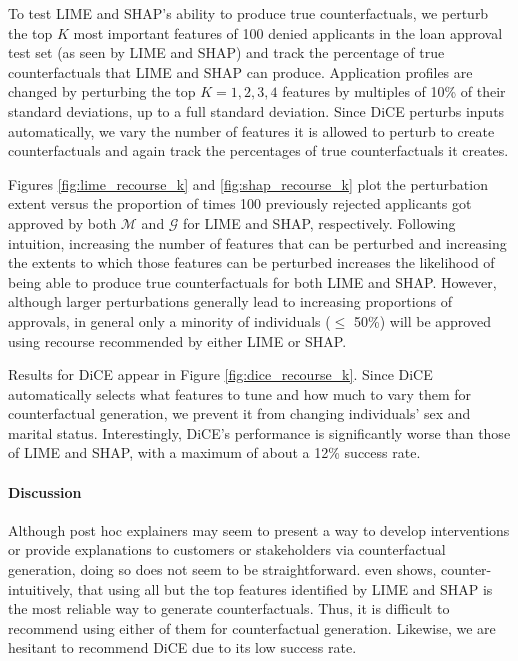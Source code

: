 \documentclass[11pt]{article}    %
\newcommand{\tw}[1]{\textcolor{red}{Tong: #1}}
\begin{document}
            
        To test LIME and SHAP's ability to produce true counterfactuals, we perturb the top $K$ most important features of 100 denied applicants in the loan approval test set (as seen by LIME and SHAP) and track the percentage of true counterfactuals that LIME and SHAP can produce.  Application profiles are changed by perturbing the top $K=1,2,3,4$ features by multiples of 10\% of their standard deviations, up to a full standard deviation. Since DiCE perturbs inputs automatically, we vary the number of features it is allowed to perturb to create counterfactuals and again track the percentages of true counterfactuals it creates.
            
            





        
            Figures \ref{fig:lime_recourse_k} and \ref{fig:shap_recourse_k} plot the perturbation extent versus the proportion of times 100 previously rejected applicants got approved by both $\mathcal{M}$ and $\mathcal{G}$ for LIME and SHAP, respectively. Following intuition, increasing the number of features that can be perturbed and increasing the extents to which those features can be perturbed increases the likelihood of being able to produce true counterfactuals for both LIME and SHAP. However, although larger perturbations generally lead to increasing proportions of approvals, in general only a minority of individuals ($\leq$ 50\%) will be approved using recourse recommended by either LIME or SHAP. 
            
            Results for DiCE appear in Figure \ref{fig:dice_recourse_k}. Since DiCE automatically selects what features to tune and how much to vary them for counterfactual generation, we prevent it from changing individuals' sex and marital status. Interestingly, DiCE's performance is significantly worse than those of LIME and SHAP, with a maximum of about a 12\% success rate. 

            \paragraph{Discussion}
            Although post hoc explainers may seem to present a way to develop interventions or provide explanations to customers or stakeholders via counterfactual generation, doing so does not seem to be straightforward. \citep{kommiya21towards} even shows, counter-intuitively, that using all but the top features identified by LIME and SHAP is the most reliable way to generate counterfactuals. Thus, it is difficult to recommend using either of them for counterfactual generation. Likewise, we are hesitant to recommend DiCE due to its low success rate.
\end{document}
